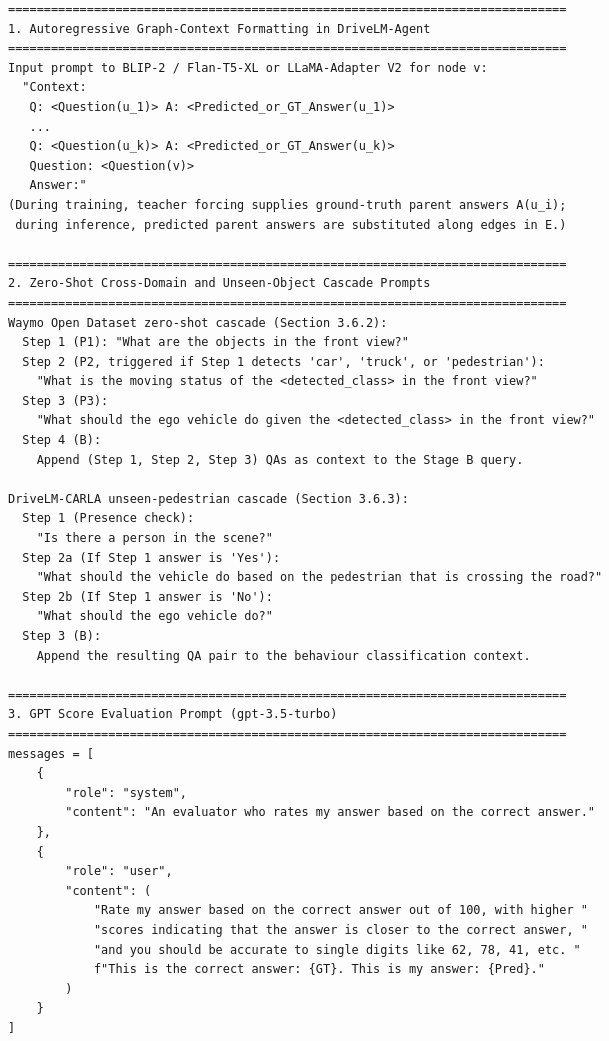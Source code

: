 \begin{footnotesize}
\begin{spacing}{1.15}
\begin{verbatim}
==============================================================================
1. Autoregressive Graph-Context Formatting in DriveLM-Agent
==============================================================================
Input prompt to BLIP-2 / Flan-T5-XL or LLaMA-Adapter V2 for node v:
  "Context:
   Q: <Question(u_1)> A: <Predicted_or_GT_Answer(u_1)>
   ...
   Q: <Question(u_k)> A: <Predicted_or_GT_Answer(u_k)>
   Question: <Question(v)>
   Answer:"
(During training, teacher forcing supplies ground-truth parent answers A(u_i);
 during inference, predicted parent answers are substituted along edges in E.)

==============================================================================
2. Zero-Shot Cross-Domain and Unseen-Object Cascade Prompts
==============================================================================
Waymo Open Dataset zero-shot cascade (Section 3.6.2):
  Step 1 (P1): "What are the objects in the front view?"
  Step 2 (P2, triggered if Step 1 detects 'car', 'truck', or 'pedestrian'):
    "What is the moving status of the <detected_class> in the front view?"
  Step 3 (P3):
    "What should the ego vehicle do given the <detected_class> in the front view?"
  Step 4 (B):
    Append (Step 1, Step 2, Step 3) QAs as context to the Stage B query.

DriveLM-CARLA unseen-pedestrian cascade (Section 3.6.3):
  Step 1 (Presence check):
    "Is there a person in the scene?"
  Step 2a (If Step 1 answer is 'Yes'):
    "What should the vehicle do based on the pedestrian that is crossing the road?"
  Step 2b (If Step 1 answer is 'No'):
    "What should the ego vehicle do?"
  Step 3 (B):
    Append the resulting QA pair to the behaviour classification context.

==============================================================================
3. GPT Score Evaluation Prompt (gpt-3.5-turbo)
==============================================================================
messages = [
    {
        "role": "system",
        "content": "An evaluator who rates my answer based on the correct answer."
    },
    {
        "role": "user",
        "content": (
            "Rate my answer based on the correct answer out of 100, with higher "
            "scores indicating that the answer is closer to the correct answer, "
            "and you should be accurate to single digits like 62, 78, 41, etc. "
            f"This is the correct answer: {GT}. This is my answer: {Pred}."
        )
    }
]
\end{verbatim}
\end{spacing}
\end{footnotesize}
